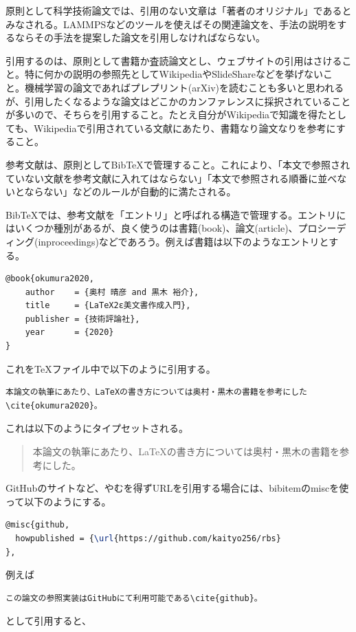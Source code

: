 \documentclass[titlepage]{jsreport}
\begin{document}
原則として科学技術論文では、引用のない文章は「著者のオリジナル」であるとみなされる。LAMMPSなどのツールを使えばその関連論文を、手法の説明をするならその手法を提案した論文を引用しなければならない。

引用するのは、原則として書籍か査読論文とし、ウェブサイトの引用はさけること。特に何かの説明の参照先としてWikipediaやSlideShareなどを挙げないこと。機械学習の論文であればプレプリント(arXiv)を読むことも多いと思われるが、引用したくなるような論文はどこかのカンファレンスに採択されていることが多いので、そちらを引用すること。たとえ自分がWikipediaで知識を得たとしても、Wikipediaで引用されている文献にあたり、書籍なり論文なりを参考にすること。

参考文献は、原則としてBibTeXで管理すること。これにより、「本文で参照されていない文献を参考文献に入れてはならない」「本文で参照される順番に並べないとならない」などのルールが自動的に満たされる。

BibTeXでは、参考文献を「エントリ」と呼ばれる構造で管理する。エントリにはいくつか種別があるが、良く使うのは書籍(book)、論文(article)、プロシーディング(inproceedings)などであろう。例えば書籍は以下のようなエントリとする。

\begin{lstlisting}[language=TeX]
@book{okumura2020,
    author    = {奥村 晴彦 and 黒木 裕介},
    title     = {LaTeX2ε美文書作成入門},
    publisher = {技術評論社},
    year      = {2020}
}
\end{lstlisting}

これをTeXファイル中で以下のように引用する。

\begin{verbatim}
本論文の執筆にあたり、LaTeXの書き方については奥村・黒木の書籍を参考にした\cite{okumura2020}。
\end{verbatim}

これは以下のようにタイプセットされる。
\begin{quotation}
    本論文の執筆にあたり、LaTeXの書き方については奥村・黒木の書籍を参考にした\cite{okumura2020}。
\end{quotation}


GitHubのサイトなど、やむを得ずURLを引用する場合には、bibitemのmiscを使って以下のようにする。

\begin{lstlisting}[language=TeX]
@misc{github,
  howpublished = {\url{https://github.com/kaityo256/rbs}
},
\end{lstlisting}

例えば

\begin{verbatim}
この論文の参照実装はGitHubにて利用可能である\cite{github}。
\end{verbatim}
として引用すると、
\end{document}
